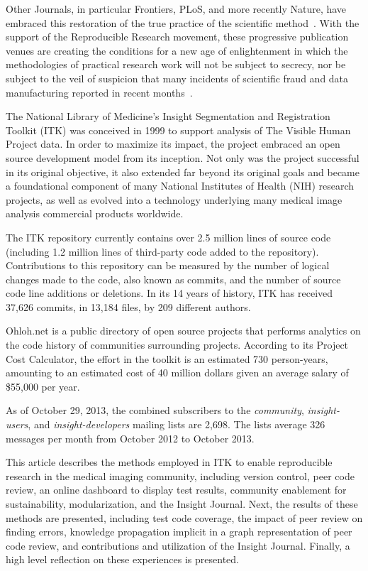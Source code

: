 \documentclass{frontiersENG} %
\begin{document}
Other Journals, in particular Frontiers, PLoS, and more recently Nature, have
embraced this restoration of the true practice of the scientific
method~\cite{NatureEditorial2013,NatureEditorial2012,Mobley2013}.  With the
support of the Reproducible Research movement, these progressive publication
venues are creating the conditions for a new age of enlightenment in which the
methodologies of practical research work will not be subject to secrecy, nor be
subject to the veil of suspicion that many incidents of scientific fraud and
data manufacturing reported in recent months~\cite{Sandve2013}.

The National Library of Medicine$’$s Insight Segmentation and Registration
Toolkit (ITK) was conceived in 1999 to support analysis of The Visible Human
Project data. In order to maximize its impact, the project embraced an open
source development model from its inception. Not only was the project
successful in its original objective, it also extended far beyond its original
goals and became a foundational component of many National Institutes of Health
(NIH) research projects, as well as evolved into a technology underlying many
medical image analysis commercial products worldwide.

%
%
The ITK repository currently contains over 2.5 million lines of source code
(including 1.2 million lines of third-party code added to the repository).
Contributions to this repository can be measured by the number of logical
changes made to the code, also known as commits, and the number of source code
line additions or deletions. In its 14 years of history, ITK has received
37,626 commits, in 13,184 files, by 209 different authors.

Ohloh.net \cite{OhlohITK2013} is a public directory of open source projects
that performs analytics on the code history of communities surrounding
projects. According to its Project Cost Calculator, the effort in the toolkit
is an estimated 730 person-years, amounting to an estimated cost of 40 million
dollars given an average salary of \$55,000 per year.

As of October 29, 2013, the combined subscribers to the \textit{community},
\textit{insight-users}, and \textit{insight-developers} mailing lists are 2,698.
The lists average 326 messages per month from October 2012 to October 2013.

This article describes the methods employed in ITK to enable reproducible
research in the medical imaging community, including version control, peer
code review, an online dashboard to display test results, community enablement
for sustainability, modularization, and the Insight Journal.  Next, the
results of these methods are presented, including test code coverage, the impact
of peer review on finding errors, knowledge propagation implicit in a graph
representation of peer code review, and contributions and utilization of the
Insight Journal.  Finally, a high level reflection on these experiences is
presented.
\end{document}
